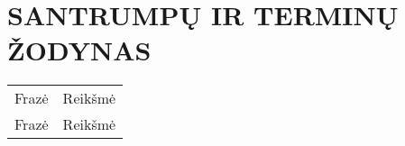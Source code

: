 \chapter*{SANTRUMPŲ IR TERMINŲ ŽODYNAS}

\begin{tabular}{l l}
  Frazė   & Reikšmė\\
  Frazė   & Reikšmė\\
\end{tabular}
